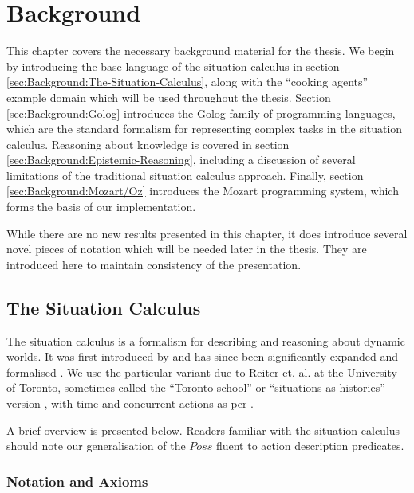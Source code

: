 


\chapter{Background}

\label{ch:background}

This chapter covers the necessary background material for the thesis.
We begin by introducing the base language of the situation calculus
in section \ref{sec:Background:The-Situation-Calculus}, along with
the {}``cooking agents'' example domain which will be used throughout
the thesis. Section \ref{sec:Background:Golog} introduces the Golog
family of programming languages, which are the standard formalism
for representing complex tasks in the situation calculus. Reasoning
about knowledge is covered in section \ref{sec:Background:Epistemic-Reasoning},
including a discussion of several limitations of the traditional situation
calculus approach. Finally, section \ref{sec:Background:Mozart/Oz}
introduces the Mozart programming system, which forms the basis of
our implementation.

While there are no new results presented in this chapter, it does
introduce several novel pieces of notation which will be needed later
in the thesis. They are introduced here to maintain consistency of
the presentation.


\section{The Situation Calculus\label{sec:Background:The-Situation-Calculus}}

The situation calculus is a formalism for describing and reasoning
about dynamic worlds. It was first introduced by \citet{McCHay69sitcalc}
and has since been significantly expanded and formalised \citep{reiter91frameprob,pirri99contributions_sitcalc}.
We use the particular variant due to Reiter et. al. at the University
of Toronto, sometimes called the {}``Toronto school'' or {}``situations-as-histories''
version \citep{levesque98sc_foundations}, with time and concurrent
actions as per \citep{reiter96sc_nat_conc}.

A brief overview is presented below. Readers familiar with the situation
calculus should note our generalisation of the $Poss$ fluent to action
description predicates.


\subsection{Notation and Axioms\label{sub:Notation-and-Axioms}}

